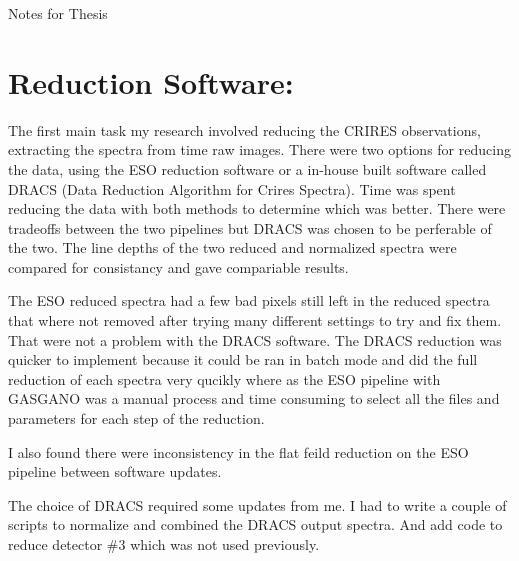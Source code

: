 
Notes for Thesis

\section{Reduction Software:}

The first main task my research involved reducing the CRIRES observations, extracting the spectra from time raw images. There were two options for reducing the data, using the ESO reduction software or a in-house built software called DRACS (Data Reduction Algorithm for Crires Spectra). Time was spent reducing the data with both methods to determine which was better. 
There were tradeoffs between the two pipelines but DRACS was chosen to be perferable of the two. The line depths of the two reduced and normalized spectra were compared for consistancy and gave compariable results.

The ESO reduced spectra had a few bad pixels still left in the reduced spectra that where not removed after trying many different settings to try and fix them.
That were not a problem with the DRACS software. 
The DRACS reduction was quicker to implement because it could be ran in batch mode and did the full reduction of each spectra very qucikly where as the ESO pipeline with GASGANO was a manual process and time consuming to select all the files and parameters for each step of the reduction. 

I also found there were inconsistency in the flat feild reduction on the ESO pipeline between software updates.

The choice of DRACS required some updates from me. I had to write a couple of scripts to normalize and combined the DRACS output spectra. And add code to reduce detector $\#3$ which was not used previously.